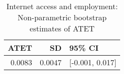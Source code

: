 \begin{table}[!h]
\centering
\caption{\label{tab:tab:np_atet}Internet access and employment: Non-parametric bootstrap estimates of ATET}
\centering
\begin{tabular}[t]{rrl}
\toprule
ATET & SD & 95\% CI\\
\midrule
0.0083 & 0.0047 & {}[-0.001, 0.017]\\
\bottomrule
\end{tabular}
\end{table}

